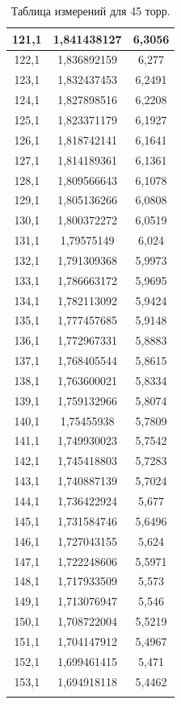 \documentclass[a4paper,12pt]{article}
\begin{document}
\begin{longtable}{|c|c|c|}
        121,1 & 1,841438127 & 6,3056 \\ \hline
        122,1 & 1,836892159 & 6,277 \\ \hline
        123,1 & 1,832437453 & 6,2491 \\ \hline
        124,1 & 1,827898516 & 6,2208 \\ \hline
        125,1 & 1,823371179 & 6,1927 \\ \hline
        126,1 & 1,818742141 & 6,1641 \\ \hline
        127,1 & 1,814189361 & 6,1361 \\ \hline
        128,1 & 1,809566643 & 6,1078 \\ \hline
        129,1 & 1,805136266 & 6,0808 \\ \hline
        130,1 & 1,800372272 & 6,0519 \\ \hline
        131,1 & 1,79575149 & 6,024 \\ \hline
        132,1 & 1,791309368 & 5,9973 \\ \hline
        133,1 & 1,786663172 & 5,9695 \\ \hline
        134,1 & 1,782113092 & 5,9424 \\ \hline
        135,1 & 1,777457685 & 5,9148 \\ \hline
        136,1 & 1,772967331 & 5,8883 \\ \hline
        137,1 & 1,768405544 & 5,8615 \\ \hline
        138,1 & 1,763600021 & 5,8334 \\ \hline
        139,1 & 1,759132966 & 5,8074 \\ \hline
        140,1 & 1,75455938 & 5,7809 \\ \hline
        141,1 & 1,749930023 & 5,7542 \\ \hline
        142,1 & 1,745418803 & 5,7283 \\ \hline
        143,1 & 1,740887139 & 5,7024 \\ \hline
        144,1 & 1,736422924 & 5,677 \\ \hline
        145,1 & 1,731584746 & 5,6496 \\ \hline
        146,1 & 1,727043155 & 5,624 \\ \hline
        147,1 & 1,722248606 & 5,5971 \\ \hline
        148,1 & 1,717933509 & 5,573 \\ \hline
        149,1 & 1,713076947 & 5,546 \\ \hline
        150,1 & 1,708722004 & 5,5219 \\ \hline
        151,1 & 1,704147912 & 5,4967 \\ \hline
        152,1 & 1,699461415 & 5,471 \\ \hline
        153,1 & 1,694918118 & 5,4462 \\ \hline
        \caption{Таблица измерений для 45 торр.}
    \end{longtable}
        




    
\end{document}
